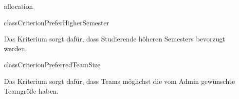\begin{texdocpackage}{allocation}
\begin{texdocclass}{class}{CriterionPreferHigherSemester}
\label{texdoclet:allocation.CriterionPreferHigherSemester}
\begin{texdocclassintro}
Das Kriterium sorgt dafür, dass Studierende höheren Semesters bevorzugt
 werden.\end{texdocclassintro}
\begin{texdocclassconstructors}
\end{texdocclassconstructors}
\begin{texdocclassmethods}
\end{texdocclassmethods}
\end{texdocclass}


\begin{texdocclass}{class}{CriterionPreferredTeamSize}
\label{texdoclet:allocation.CriterionPreferredTeamSize}
\begin{texdocclassintro}
Das Kriterium sorgt dafür, dass Teams möglichst die vom Admin gewünschte
 Teamgröße haben.\end{texdocclassintro}
\begin{texdocclassconstructors}
\end{texdocclassconstructors}
\begin{texdocclassmethods}
\end{texdocclassmethods}
\end{texdocclass}



\end{texdocpackage}
